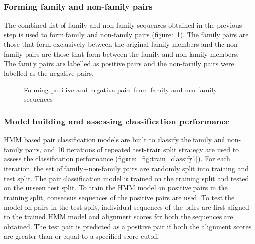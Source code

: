 \documentclass{article}
\begin{document}
			\subsubsection{Forming family and non-family pairs}
			The combined list of family and non-family sequences obtained in the previous step is used to form family and non-family pairs (figure:~\ref{fig:forming_pairs}). The family pairs are those that form exclusively between the original family members and the non-family pairs are those that form between the family and non-family members. The family pairs are labelled as positive pairs and the non-family pairs were labelled as the negative pairs.
			
			\begin{figure}
				\caption{Forming positive and negative pairs from family and non-family sequences}
				\label{fig:forming_pairs}
			\end{figure}
			
			\subsubsection{Model building and assessing classification performance}
			HMM based pair classification models are built to classify the family and non-family pairs, and 10 iterations of repeated test-train split strategy are used to assess the classification performance (figure:~\ref{fig:train_classify1}). For each iteration, the set of family+non-family pairs are randomly split into training and test split. The pair classification model is trained on the training split and tested on the unseen test split. To train the HMM model on positive pairs in the training split, consensus sequences of the positive pairs are used. To test the model on pairs in the test split, individual sequences of the pairs are first aligned to the trained HMM model and alignment scores for both the sequences are obtained. The test pair is predicted as a positive pair if both the alignment scores are greater than or equal to a specified score cutoff.
			
\end{document}
